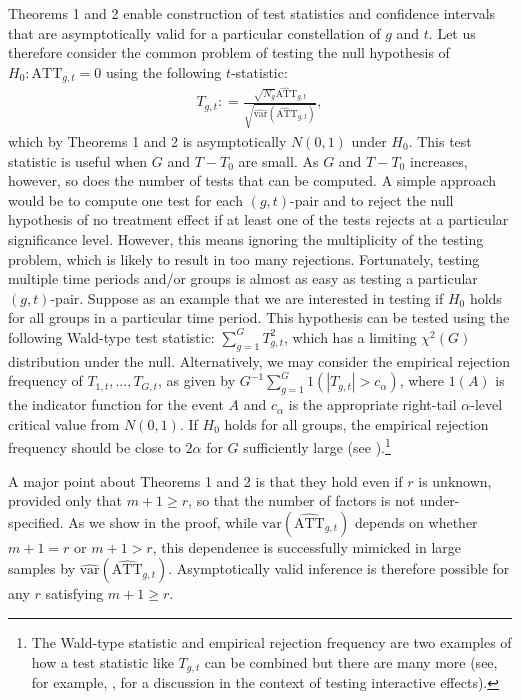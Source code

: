 \documentclass[12pt,fleqn]{article}
\begin{document}
  Theorems 1 and 2 enable construction of test statistics and confidence intervals that are asymptotically valid for a particular constellation of $g$ and $t$. Let us therefore consider the common problem of testing the null hypothesis of $H_0: \mathrm{ATT}_{g,t} = 0$ using the following $t$-statistic:
  \begin{align}
  T_{g,t} : = \frac{\sqrt{N_g}\widehat{\mathrm{ATT}}_{g,t}}{\sqrt{\widehat{\mathrm{var}}(\widehat{\mathrm{ATT}}_{g,t})}} ,
  \end{align}
  which by Theorems 1 and 2 is asymptotically $N(0,1)$ under $H_0$. This test statistic is useful when $G$ and $T-T_0$ are small. As $G$ and $T-T_0$ increases, however, so does the number of tests that can be computed. A simple approach would be to compute one test for each $(g,t)$-pair and to reject the null hypothesis of no treatment effect if at least one of the tests rejects at a particular significance level. However, this means ignoring the multiplicity of the testing problem, which is likely to result in too many rejections. Fortunately, testing multiple time periods and/or groups is almost as easy as testing a particular $(g,t)$-pair. Suppose as an example that we are interested in testing if $H_0$ holds for all groups in a particular time period. This hypothesis can be tested using the following Wald-type test statistic: $\sum_{g=1}^G T_{g,t}^2$, which has a limiting $\chi^2(G)$ distribution under the null. Alternatively, we may consider the empirical rejection frequency of $T_{1,t},...,T_{G,t}$, as given by $G^{-1}\sum_{g=1}^G 1(|T_{g,t}| > c_\alpha)$, where $1(A)$ is the indicator function for the event $A$ and $c_\alpha$ is the appropriate right-tail $\alpha$-level critical value from $N(0,1)$. If $H_0$ holds for all groups, the empirical rejection frequency should be close to $2\alpha$ for $G$ sufficiently large (see \citealp{Bai_Ng_2006}).\footnote{The Wald-type statistic and empirical rejection frequency are two examples of how a test statistic like $T_{g,t}$ can be combined but there are many more (see, for example, \citealp{Bai_Ng_2006}, for a discussion in the context of testing interactive effects).}
  
  A major point about Theorems 1 and 2 is that they hold even if $r$ is unknown, provided only that $m+1 \geq r$, so that the number of factors is not under-specified. As we show in the proof, while $\mathrm{var}(\widehat{\mathrm{ATT}}_{g,t})$ depends on whether $m+1 = r$ or $m+1 > r$, this dependence is successfully mimicked in large samples by $\widehat{\mathrm{var}}(\widehat{\mathrm{ATT}}_{g,t})$. Asymptotically valid inference is therefore possible for any $r$ satisfying $m+1 \geq r$.
  
\end{document}
